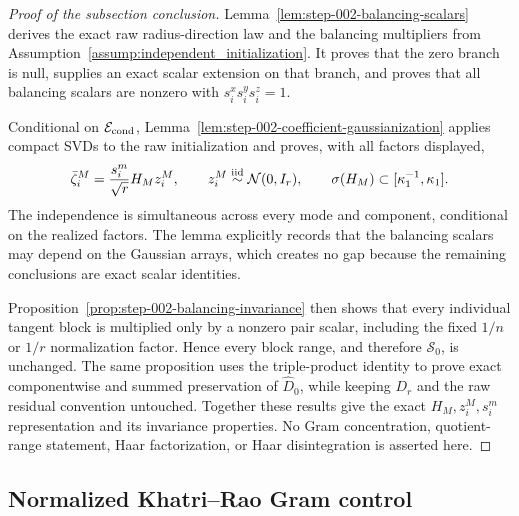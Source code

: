 \begin{proof}[Proof of the subsection conclusion]

Lemma~\ref{lem:step-002-balancing-scalars} derives the exact raw
radius-direction law and the balancing multipliers from
Assumption~\ref{assump:independent_initialization}. It proves that the zero
branch is null, supplies an exact scalar extension on that branch, and proves
that all balancing scalars are nonzero with
\(s_i^xs_i^ys_i^z=1\).

Conditional on \(\mathcal E_{\rm cond}\),
Lemma~\ref{lem:step-002-coefficient-gaussianization} applies compact SVDs to
the raw initialization and proves, with all factors displayed,
\[
  \bar\zeta_i^M=\frac{s_i^m}{\sqrt r}H_Mz_i^M,
  \qquad z_i^M\stackrel{\rm iid}{\sim}\mathcal N(0,I_r),
  \qquad \sigma(H_M)\subset[\kappa_1^{-1},\kappa_1].
\]
The independence is simultaneous across every mode and component, conditional
on the realized factors. The lemma explicitly records that the balancing
scalars may depend on the Gaussian arrays, which creates no gap because the
remaining conclusions are exact scalar identities.

Proposition~\ref{prop:step-002-balancing-invariance} then shows that every
individual tangent block is multiplied only by a nonzero pair scalar, including
the fixed \(1/n\) or \(1/r\) normalization factor. Hence every block range,
and therefore \(\mathscr S_0\), is unchanged. The same proposition uses the
triple-product identity to prove exact componentwise and summed preservation
of \(\widehat D_0\), while keeping \(D_r\) and the raw residual convention
untouched. Together these results give the exact
\(H_M,z_i^M,s_i^m\) representation and its invariance properties.
No Gram concentration, quotient-range statement, Haar factorization, or Haar
disintegration is asserted here.

\end{proof}

\subsection{Normalized Khatri--Rao Gram control}\label{app:step-003}

